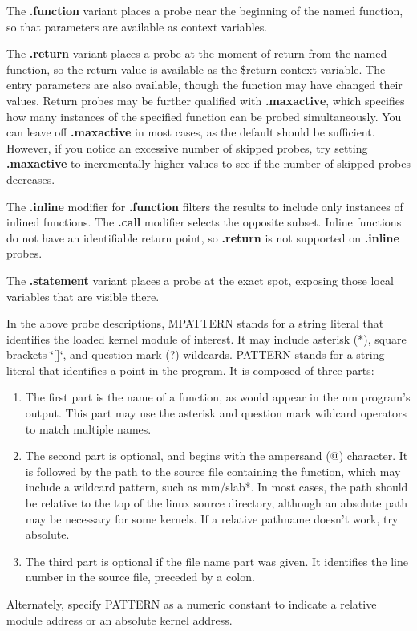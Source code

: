 \documentclass[twoside,english]{article}
\begin{document}
The \textbf{.function} variant places a probe near the beginning of the named
function, so that parameters are available as context variables. 

The \textbf{.return} variant places a probe at the moment of return from the named
function, so the return value is available as the \$return context variable.
The entry parameters are also available, though the function may have changed
their values.  Return probes may be further qualified with \textbf{.maxactive}, 
which specifies how many instances of the specified function can be probed simultaneously.
You can leave off \textbf{.maxactive} in most cases, as the default should be sufficient.
However, if you notice an excessive number of skipped probes, try setting \textbf{.maxactive}
to incrementally higher values to see if the number of skipped probes decreases.

The \textbf{.inline} modifier for \textbf{.function} filters the results to include only 
instances of inlined functions. The \textbf{.call} modifier selects the opposite subset.
Inline functions do not have an identifiable return point, so \textbf{.return}
is not supported on \textbf{.inline} probes.

The \textbf{.statement} variant places a probe at the exact spot, exposing those local
variables that are visible there.

In the above probe descriptions, MPATTERN stands for a string literal
that identifies the loaded kernel module of interest. It may include asterisk
({*}), square brackets \char`\"{}{[}]\char`\"{}, and question mark (?) wildcards.
PATTERN stands for a string literal that identifies a point in the program.
It is composed of three parts:

\begin{enumerate}
\item The first part is the name of a function, as would appear in the nm program's
output. This part may use the asterisk and question mark wildcard operators
to match multiple names.
\item The second part is optional, and begins with the ampersand (@) character.
It is followed by the path to the source file containing the function,
which may include a wildcard pattern, such as mm/slab{*}.
In most cases, the path should be relative to the top of the
linux source directory, although an absolute path may be necessary for some kernels.
If a relative pathname doesn't work, try absolute.
\item The third part is optional if the file name part was given. It identifies
the line number in the source file, preceded by a colon. 
\end{enumerate}
Alternately, specify PATTERN as a numeric constant to indicate a relative
module address or an absolute kernel address.
\end{document}
